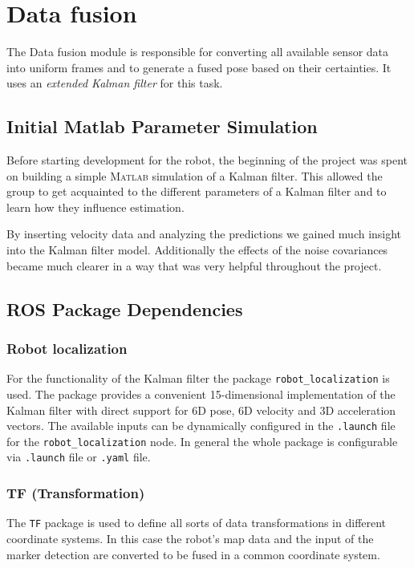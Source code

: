 \chapter{Data fusion}
The Data fusion module is responsible for converting all available sensor data into uniform frames and to generate a fused pose based on their certainties. It uses an \textit{extended Kalman filter} for this task.
\label{Kalman chapter}
\section{Initial Matlab Parameter Simulation}
Before starting development for the robot, the beginning of the project was spent on building a simple \textsc{Matlab} simulation of a Kalman filter.
This allowed the group to get acquainted to the different parameters of a Kalman filter and to learn how they influence estimation.

By inserting velocity data and analyzing the predictions we gained much insight into the Kalman filter model. Additionally the effects of the noise covariances became much clearer in a way that was very helpful throughout the project.

\section{ROS Package Dependencies}
\subsection{Robot localization}
For the functionality of the Kalman filter the package \texttt{robot\_localization} is used. The package provides a convenient 15-dimensional implementation of the Kalman filter with direct support for 6D pose, 6D velocity and 3D acceleration vectors. The available inputs can be dynamically configured in the \texttt{.launch} file for the \texttt{robot\_localization} node. In general the whole package is configurable via \texttt{.launch} file or \texttt{.yaml} file.

\subsection{TF (Transformation)}
The \texttt{TF} package is used to define all sorts of data transformations in different coordinate systems. In this case the robot's map data and the input of the marker detection are converted to be fused in a common coordinate system. 

